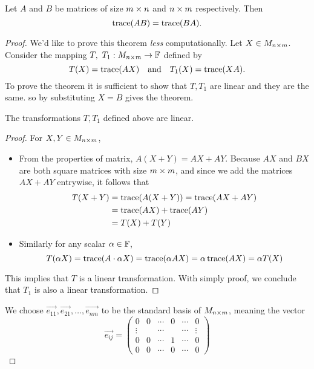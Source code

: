 \begin{homework}\label{_trace}
  Let $A$ and $B$ be matrices of size $m\times n$ and $n\times m$ 
  respectively. Then \[\operatorname{trace}(AB)=\operatorname{trace}(BA).\]
\end{homework}
\begin{proof}
  We'd like to prove this theorem \emph{less} computationally.
  Let $X\in M_{n\times m}$. Consider the mapping
  $T,~T_1: M_{n\times m}\to\mathbb{F}$ defined by
  \[
    T(X)=\operatorname{trace}(AX)
    \quad\text{and}\quad
    T_1(X)=\operatorname{trace}(XA).
  \]
  To prove the theorem it is sufficient to show that 
  $T,T_1$ are linear and they are the same.
  so by substituting $X=B$ gives the theorem.
  \begin{claim}
    The transformations $T,T_1$ defined above are linear.
  \end{claim}
  \begin{proof}
    For $X,Y\in M_{n\times m}$,
    \begin{itemize}
      \item From the properties of matrix, $A(X+Y)=AX+AY$. 
        Because $AX$ and $BX$ are both square matrices with 
        size $m\times m$, and since we add the matrices $AX+AY$
        entrywise, it follows that
        \begin{align*}
          T(X+Y)&=\operatorname{trace}(A(X+Y))=\operatorname{trace}(AX+AY)\\
                &=\operatorname{trace}(AX)+\operatorname{trace}(AY)\\
                &=T(X)+T(Y)
        \end{align*}
      \item Similarly for any scalar $\alpha\in\mathbb{F}$,
        \[
          T(\alpha X)=\operatorname{trace}(A\cdot\alpha X)
          =\operatorname{trace}(\alpha AX)=\alpha\operatorname{trace}(AX)=\alpha T(X)
        \]
    \end{itemize}
    This implies that $T$ is a linear transformation. With simply
    proof, we conclude that $T_1$ is also a linear transformation.
  \end{proof}
  We choose $\vec{e_{11}},\vec{e_{21}},\dots,\vec{e_{nm}}$ to be 
  the standard basis of $M_{n\times m}$, meaning the vector
  \[
    \vec{e_{ij}}=
    \begin{pmatrix}
      0 & 0 & \cdots & 0 & \cdots & 0\\
      \vdots  & & \cdots & & \cdots & \vdots\\
      0 & 0 & \cdots & 1 & \cdots & 0\\
      0 & 0 & \cdots & 0 & \cdots & 0
    \end{pmatrix}
\]
\end{proof}
